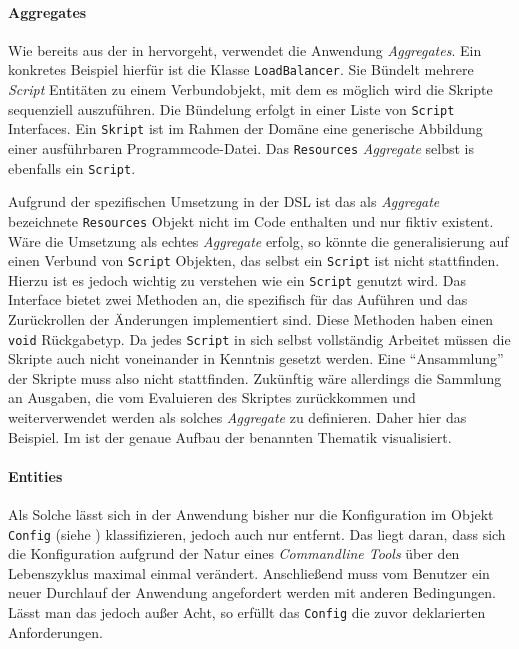 \paragraph{Aggregates} 

Wie bereits aus der in  hervorgeht, verwendet die Anwendung \emph{Aggregates}.
Ein konkretes Beispiel hierfür ist die Klasse \texttt{LoadBalancer}.
Sie Bündelt mehrere \emph{Script} Entitäten zu einem Verbundobjekt, mit dem es möglich wird die Skripte sequenziell auszuführen.
Die Bündelung erfolgt in einer Liste von \texttt{Script} Interfaces.
Ein \texttt{Skript} ist im Rahmen der Domäne eine generische Abbildung einer ausführbaren Programmcode-Datei.
Das \texttt{Resources} \emph{Aggregate} selbst is ebenfalls ein \texttt{Script}.

Aufgrund der spezifischen Umsetzung in der DSL ist das als \emph{Aggregate} bezeichnete \texttt{Resources} Objekt nicht im Code enthalten und nur fiktiv existent. 
Wäre die Umsetzung als echtes \emph{Aggregate} erfolg, so könnte die generalisierung auf einen Verbund von \texttt{Script} Objekten, das selbst ein \texttt{Script} ist nicht stattfinden.
Hierzu ist es jedoch wichtig zu verstehen wie ein \texttt{Script} genutzt wird.
Das Interface bietet zwei Methoden an, die spezifisch für das Auführen und das Zurückrollen der Änderungen implementiert sind.
Diese Methoden haben einen \texttt{void} Rückgabetyp.
Da jedes \texttt{Script} in sich selbst vollständig Arbeitet müssen die Skripte auch nicht voneinander in Kenntnis gesetzt werden.
Eine \enquote{Ansammlung} der Skripte muss also nicht stattfinden. 
Zukünftig wäre allerdings die Sammlung an Ausgaben, die vom Evaluieren des Skriptes zurückkommen und weiterverwendet werden als solches \emph{Aggregate} zu definieren.
Daher hier das Beispiel.
Im  ist der genaue Aufbau der benannten Thematik visualisiert.

\bgroup

    \label{lst:ressources_builder}
\egroup

\paragraph{Entities} 

Als Solche lässt sich in der Anwendung bisher nur die Konfiguration im Objekt \texttt{Config} (siehe ) klassifizieren, jedoch auch nur entfernt.
Das liegt daran, dass sich die Konfiguration aufgrund der Natur eines \emph{Commandline Tools} über den Lebenszyklus maximal einmal verändert.
Anschließend muss vom Benutzer ein neuer Durchlauf der Anwendung angefordert werden mit anderen Bedingungen.
Lässt man das jedoch außer Acht, so erfüllt das \texttt{Config} die zuvor deklarierten Anforderungen.

